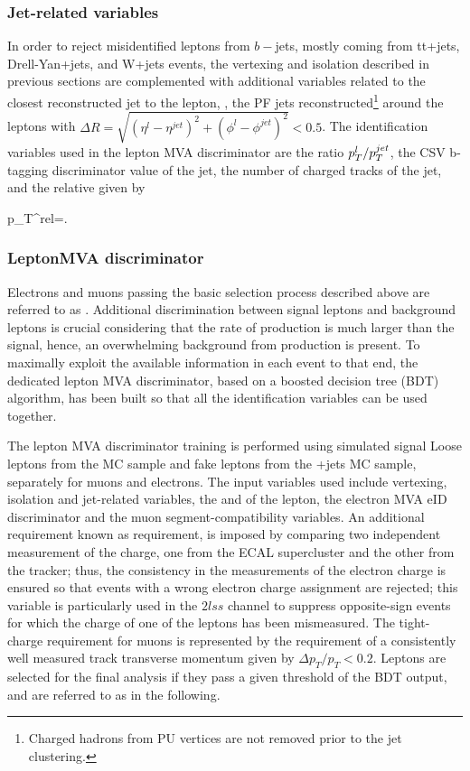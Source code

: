 \subsubsection*{Jet-related variables}

In order to reject misidentified leptons from $b-$jets, mostly coming from tt+jets, Drell-Yan+jets, and W+jets events, the vertexing and isolation described in previous sections are complemented with additional variables related to the closest reconstructed jet to the lepton, \ie, the PF jets reconstructed\footnote{Charged hadrons from PU vertices are not removed prior to the jet clustering.} around the leptons with $\Delta R=\sqrt{( \eta^l - \eta^{jet})^2 + (\phi^l - \phi^{jet})^2} < 0.5$. The identification variables used in the lepton MVA discriminator are the ratio $p_T^l/p_T^{jet}$, the CSV b-tagging discriminator value of the jet, the number of charged tracks of the jet, and the relative \pt given by

\beqn
p_T^{rel}=.
\eeqn


\subsubsection*{LeptonMVA discriminator}\label{sssec:leptonmva}

Electrons and muons passing the basic selection process described above are referred to as . Additional discrimination between signal leptons and background leptons is crucial considering that the rate of \ttbar production is much larger than the signal, hence, an overwhelming background from \ttbar production is present. To maximally exploit the available information in each event to that end, the dedicated lepton MVA discriminator, based on a boosted decision tree (BDT) algorithm, has been built so that all the identification variables can be used together.

The lepton MVA discriminator training is performed using simulated signal Loose leptons from the \ttH MC sample and fake leptons from the \ttbar+jets MC sample, separately for muons and electrons. The input variables used include vertexing, isolation and jet-related variables, the \pt and \etac of the lepton, the electron MVA eID discriminator and the muon segment-compatibility variables. An additional requirement known as  requirement, is imposed by comparing two independent measurement of the charge, one from the ECAL supercluster and the other from the tracker; thus, the consistency in the measurements of the electron charge is ensured so that events with a wrong electron charge assignment are rejected; this variable is particularly used in the $2lss$ channel to suppress opposite-sign events for which the charge of one of the leptons has been mismeasured. The tight-charge requirement for muons is represented by the requirement of a consistently well measured track transverse momentum given by $\Delta p_T/p_T < 0.2$.          
Leptons are selected for the final analysis if they pass a given threshold of the BDT output, and are referred to as  in the following.          

